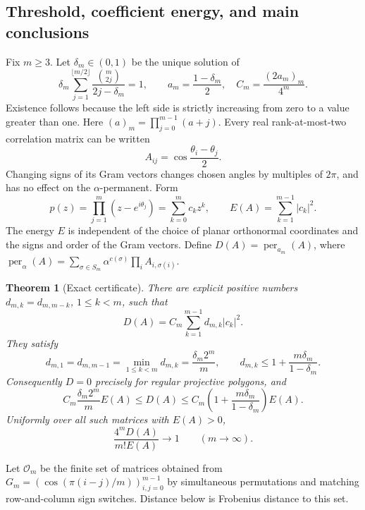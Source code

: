 \documentclass[11pt,a4paper]{article}
\newtheorem{theorem}{Theorem}[section]
\theoremstyle{definition}\newtheorem{definition}[theorem]{Definition}
\theoremstyle{remark}\newtheorem{remark}[theorem]{Remark}
\numberwithin{equation}{section}
\begin{document}
\subsection{Threshold, coefficient energy, and main conclusions}\label{S10-sec-1}
Fix $m\ge3$. Let $\delta_m\in(0,1)$ be the unique solution of
\begin{equation}\label{S10-root}
 \delta_m\sum_{j=1}^{\lfloor m/2\rfloor}
 \frac{\binom m{2j}}{2j-\delta_m}=1,
 \qquad a_m=\frac{1-\delta_m}{2},\quad C_m=\frac{(2a_m)_m}{4^m}.
\end{equation}
Existence follows because the left side is strictly increasing from zero to a value greater than one. Here $(a)_m=\prod_{j=0}^{m-1}(a+j)$.
Every real rank-at-most-two correlation matrix can be written
\[
 A_{ij}=\cos\frac{\theta_i-\theta_j}{2}.
\]
Changing signs of its Gram vectors changes chosen angles by multiples of $2\pi$, and has no effect on the $\alpha$-permanent. Form
\[
 p(z)=\prod_{j=1}^m(z-e^{i\theta_j})=\sum_{k=0}^mc_kz^k,
 \qquad E(A)=\sum_{k=1}^{m-1}|c_k|^2.
\]
The energy $E$ is independent of the choice of planar orthonormal coordinates and the signs and order of the Gram vectors. Define $D(A)=\operatorname{per}_{a_m}(A)$, where
$\operatorname{per}_\alpha(A)=\sum_{\sigma\in S_m}\alpha^{c(\sigma)}\prod_iA_{i,\sigma(i)}$.
\begin{theorem}[Exact certificate]\label{S10-sos}
There are explicit positive numbers $d_{m,k}=d_{m,m-k}$, $1\le k<m$, such that
\begin{equation}\label{S10-SOS}
 D(A)=C_m\sum_{k=1}^{m-1}d_{m,k}|c_k|^2.
\end{equation}
They satisfy
\begin{equation}\label{S10-weightbounds}
 d_{m,1}=d_{m,m-1}=\min_{1\le k<m}d_{m,k}
 =\frac{\delta_m2^m}{m},\qquad
 d_{m,k}\le1+\frac{m\delta_m}{1-\delta_m}.
\end{equation}
Consequently $D=0$ precisely for regular projective polygons, and
\begin{equation}\label{S10-sandwich}
 C_m\frac{\delta_m2^m}{m}E(A)
 \le D(A)\le C_m\left(1+\frac{m\delta_m}{1-\delta_m}\right)E(A).
\end{equation}
Uniformly over all such matrices with $E(A)>0$,
\begin{equation}\label{S10-uniform}
 \frac{4^mD(A)}{m!E(A)}\longrightarrow1\qquad(m\to\infty).
\end{equation}
\end{theorem}
Let $\mathcal O_m$ be the finite set of matrices obtained from
$G_m=(\cos(\pi(i-j)/m))_{i,j=0}^{m-1}$ by simultaneous permutations and matching row-and-column sign switches. Distance below is Frobenius distance to this set.
\end{document}

